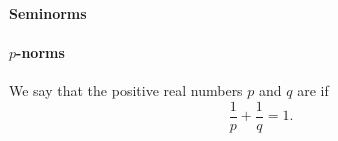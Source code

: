 \paragraph{Seminorms}

\begin{definition}\label{def:seminorm}
\end{definition}

\paragraph{\( p \)-norms}

\begin{definition}\label{def:conjugate_exponent}
  We say that the positive real numbers \( p \) and \( q \) are  if
  \begin{equation}\label{eq:def:conjugate_exponent}
    \frac 1 p  + \frac 1 q = 1.
  \end{equation}
\end{definition}

